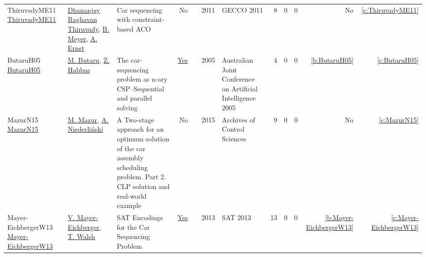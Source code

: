 {\begin{longtable}{>{\raggedright\arraybackslash}p{3cm}>{\raggedright\arraybackslash}p{6cm}>{\raggedright\arraybackslash}p{6.5cm}rrrp{2.5cm}rrrrr}
ThiruvadyME11 \href{}{ThiruvadyME11} & \hyperref[auth:a26]{Dhananjay Raghavan Thiruvady}, \hyperref[auth:a27]{B. Meyer}, \hyperref[auth:a28]{A. Ernst} & Car sequencing with constraint-based ACO & No & \cite{ThiruvadyME11} & 2011 & GECCO 2011 & 8 & 0 & 0 & No & \ref{c:ThiruvadyME11}\\
ButaruH05 \href{}{ButaruH05} & \hyperref[auth:a29]{M. Butaru}, \hyperref[auth:a30]{Z. Habbas} & The car-sequencing problem as n-ary CSP--Sequential and parallel solving & \href{../cars/works/ButaruH05.pdf}{Yes} & \cite{ButaruH05} & 2005 & Australian Joint Conference on Artificial Intelligence 2005 & 4 & 0 & 0 & \ref{b:ButaruH05} & \ref{c:ButaruH05}\\
MazurN15 \href{}{MazurN15} & \hyperref[auth:a31]{M. Mazur}, \hyperref[auth:a32]{A. Niederli{\'n}ski} & A Two-stage approach for an optimum solution of the car assembly scheduling problem. Part 2. CLP solution and real-world example & No & \cite{MazurN15} & 2015 & Archives of Control Sciences & 9 & 0 & 0 & No & \ref{c:MazurN15}\\
Mayer-EichbergerW13 \href{https://doi.org/10.29007/jrsp}{Mayer-EichbergerW13} & \hyperref[auth:a35]{V. Mayer{-}Eichberger}, \hyperref[auth:a36]{T. Walsh} & {SAT} Encodings for the Car Sequencing Problem & \href{../cars/works/Mayer-EichbergerW13.pdf}{Yes} & \cite{Mayer-EichbergerW13} & 2013 & SAT 2013 & 13 & 0 & 0 & \ref{b:Mayer-EichbergerW13} & \ref{c:Mayer-EichbergerW13}\\
\end{longtable}
}

